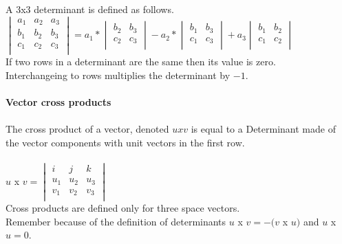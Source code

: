 \documentclass[14pt]{extreport}
\begin{document}
A 3x3  determinant is defined as follows.\\

$\begin{vmatrix}
a_1 &  a_2 & a_3\\
b_1 &  b_2 & b_3\\
c_1 & c_2 & c_3\\
\end{vmatrix} 
= a_1 * 
\begin{vmatrix}
b_2 &  b_3\\
c_2 &  c_3 \\
\end{vmatrix} 
- a_2 * 
\begin{vmatrix}
b_1 &  b_3\\
c_1 &  c_3 \\
\end{vmatrix}
+ a_3 
\begin{vmatrix}
b_1 &  b_2\\
c_1 &  c_2 \\
\end{vmatrix}$\\

If two rows in a determinant are the same then its value is zero.\\
Interchangeing to rows multiplies the determinant by $-1$.\\\\

\textbf{Vector cross products}\\\\

The cross product of a vector, denoted $u x v$ is equal to a Determinant made of the vector components with unit vectors in the first row.\\\\

$u$ x $v =
\begin{vmatrix}
i & j & k\\
u_1 & u_2 & u_3\\
v_1 & v_2 & v_3\\
\end{vmatrix}$
\\

Cross products are defined only for three space vectors.\\

Remember because of the definition of determinants $u$ x $v = -(v $ x $ u)$ and $u$ x $u = 0$.\\\\
\end{document}
